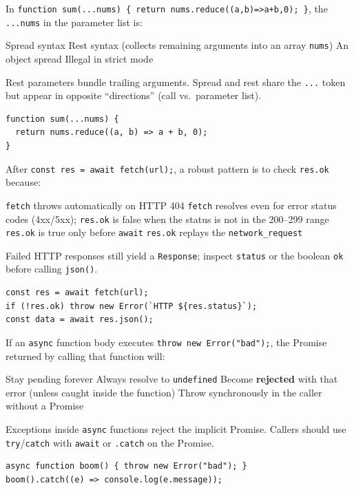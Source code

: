 \newpage
\question[4]
In \texttt{function sum(...nums) \{ return nums.reduce((a,b)=>a+b,0); \}}, the \texttt{...nums} in the parameter list is:
\begin{choices}
  \choice Spread syntax
  \CorrectChoice Rest syntax (collects remaining arguments into an array \texttt{nums})
  \choice An object spread
  \choice Illegal in strict mode
\end{choices}
\begin{solution}
  Rest parameters bundle trailing arguments. Spread and rest share the \texttt{...} token but appear in opposite ``directions'' (call vs.\ parameter list).
\begin{lstlisting}[style=js]
function sum(...nums) {
  return nums.reduce((a, b) => a + b, 0);
}
\end{lstlisting}
\end{solution}

\question[4]
After \texttt{const res = await fetch(url);}, a robust pattern is to check \texttt{res.ok} because:
\begin{choices}
  \choice \texttt{fetch} throws automatically on HTTP 404
  \CorrectChoice \texttt{fetch} resolves even for error status codes (4xx/5xx); \texttt{res.ok} is false when the status is not in the 200--299 range
  \choice \texttt{res.ok} is true only before \texttt{await}
  \choice \texttt{res.ok} replays the \texttt{network\_request}
\end{choices}
\begin{solution}
  Failed HTTP responses still yield a \texttt{Response}; inspect \texttt{status} or the boolean \texttt{ok} before calling \texttt{json()}.
\begin{lstlisting}[style=js]
const res = await fetch(url);
if (!res.ok) throw new Error(`HTTP ${res.status}`);
const data = await res.json();
\end{lstlisting}
\end{solution}

\question[4]
If an \texttt{async} function body executes \texttt{throw new Error("bad");}, the Promise returned by calling that function will:
\begin{choices}
  \choice Stay pending forever
  \choice Always resolve to \texttt{undefined}
  \CorrectChoice Become \textbf{rejected} with that error (unless caught inside the function)
  \choice Throw synchronously in the caller without a Promise
\end{choices}
\begin{solution}
  Exceptions inside \texttt{async} functions reject the implicit Promise. Callers should use \texttt{try}/\texttt{catch} with \texttt{await} or \texttt{.catch} on the Promise.
\begin{lstlisting}[style=js]
async function boom() { throw new Error("bad"); }
boom().catch((e) => console.log(e.message));
\end{lstlisting}
\end{solution}

